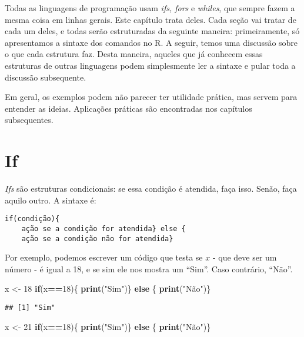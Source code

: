 \documentclass[]{book}
\newenvironment{Shaded}{\begin{snugshade}}{\end{snugshade}}
\newcommand{\KeywordTok}[1]{\textcolor[rgb]{0.13,0.29,0.53}{\textbf{#1}}}
\newcommand{\DecValTok}[1]{\textcolor[rgb]{0.00,0.00,0.81}{#1}}
\newcommand{\StringTok}[1]{\textcolor[rgb]{0.31,0.60,0.02}{#1}}
\newcommand{\ControlFlowTok}[1]{\textcolor[rgb]{0.13,0.29,0.53}{\textbf{#1}}}
\newcommand{\OperatorTok}[1]{\textcolor[rgb]{0.81,0.36,0.00}{\textbf{#1}}}
\newcommand{\NormalTok}[1]{#1}
\begin{document}
Todas as linguagens de programação usam \emph{ifs, fors} e
\emph{whiles}, que sempre fazem a mesma coisa em linhas gerais. Este
capítulo trata deles. Cada seção vai tratar de cada um deles, e todas
serão estruturadas da seguinte maneira: primeiramente, só apresentamos a
sintaxe dos comandos no R. A seguir, temos uma discussão sobre o que
cada estrutura faz. Desta maneira, aqueles que já conhecem essas
estruturas de outras linguagens podem simplesmente ler a sintaxe e pular
toda a discussão subsequente.

Em geral, os exemplos podem não parecer ter utilidade prática, mas
servem para entender as ideias. Aplicações práticas são encontradas nos
capítulos subsequentes.

\section{If}\label{if}

\emph{Ifs} são estruturas condicionais: se essa condição é atendida,
faça isso. Senão, faça aquilo outro. A sintaxe é:

\begin{verbatim}
if(condição){
    ação se a condição for atendida} else {
    ação se a condição não for atendida}
\end{verbatim}

Por exemplo, podemos escrever um código que testa se \(x\) - que deve
ser um número - é igual a 18, e se sim ele nos mostra um ``Sim''. Caso
contrário, ``Não''.

\begin{Shaded}
\begin{Highlighting}[]
\NormalTok{x <-}\StringTok{ }\DecValTok{18}
\ControlFlowTok{if}\NormalTok{(x}\OperatorTok{==}\DecValTok{18}\NormalTok{)\{}
    \KeywordTok{print}\NormalTok{(}\StringTok{"Sim"}\NormalTok{)\} }\ControlFlowTok{else}\NormalTok{ \{}
    \KeywordTok{print}\NormalTok{(}\StringTok{"Não"}\NormalTok{)\}}
\end{Highlighting}
\end{Shaded}

\begin{verbatim}
## [1] "Sim"
\end{verbatim}

\begin{Shaded}
\begin{Highlighting}[]
\NormalTok{x <-}\StringTok{ }\DecValTok{21}
\ControlFlowTok{if}\NormalTok{(x}\OperatorTok{==}\DecValTok{18}\NormalTok{)\{}
    \KeywordTok{print}\NormalTok{(}\StringTok{"Sim"}\NormalTok{)\} }\ControlFlowTok{else}\NormalTok{ \{}
    \KeywordTok{print}\NormalTok{(}\StringTok{"Não"}\NormalTok{)\}}
\end{Highlighting}
\end{Shaded}
\end{document}
